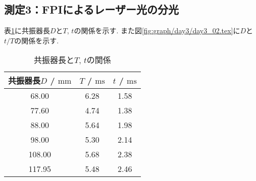 \subsection{測定3：FPIによるレーザー光の分光}
表\ref{tab:kyosinki_Tt}に共振器長$D$と$T$, $t$の関係を示す.
また図\ref{fig:graph/day3/day3_02.tex}に$D$と$t/T$の関係を示す.
\begin{table}[h]
\caption{共振器長と$T$, $t$の関係}
\label{tab:kyosinki_Tt}
\centering
\begin{tabular}{c|cc}
\hline
共振器長$D$ / $\si{\milli\metre}$&$T$ / $\si{\milli\second}$&$t$ / $\si{\milli\second}$\\
\hline \hline
68.00 & 6.28 & 1.58\\
77.60 & 4.74 & 1.38\\
88.00 & 5.64 & 1.98\\
98.00 & 5.30 & 2.14\\
108.00 & 5.68 & 2.38\\
117.95 & 5.48 & 2.46\\
\hline
\end{tabular}
\end{table}
